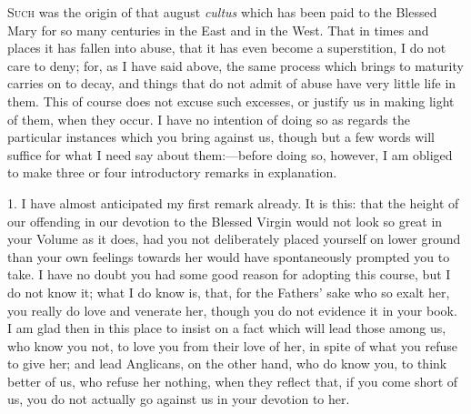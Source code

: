S\textsc{uch} was the origin of that august \emph{cultus} which has been
paid to the Blessed Mary for so many centuries in the East and in the
West. That in times and places it has fallen into abuse, that it has
even become a superstition, I do not care to deny; for, as I have said
above, the same process which brings to maturity carries on to decay,
and things that do not admit of abuse have very little life in them.
This of course does not excuse such excesses, or justify us in making
light of them, when they occur. I have no intention of doing so as
regards the particular instances which you bring against us, though but
a few words will suffice for what I need say about them:—before doing
so, however, I am obliged to make three or four introductory remarks in
explanation.

1. I have almost anticipated my first remark already. It is this:
that the height of our offending in our devotion to the Blessed Virgin
would not look so great in your Volume as it does, had you not
deliberately placed yourself on lower ground than your own feelings
towards her would have spontaneously prompted you to take. I have no
doubt you had some good reason for adopting this course, but I do
not know it; what I do know is, that, for the Fathers' sake who so exalt
her, you really do love and venerate her, though you do not evidence it
in your book. I am glad then in this place to insist on a fact which
will lead those among us, who know you not, to love you from their love
of her, in spite of what you refuse to give her; and lead Anglicans, on
the other hand, who do know you, to think better of us, who refuse her
nothing, when they reflect that, if you come short of us, you do not
actually go against us in your devotion to her.

